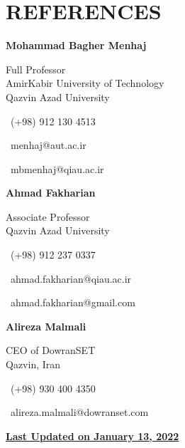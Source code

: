 \documentclass[10pt,a4paper,sans]{moderncv} %
\begin{document}
	\section{REFERENCES}
    \vspace{-1.5em}
    \begin{multicols}{3}
	        
	        \textbf{Mohammad Bagher Menhaj}
	        
	        Full Professor\\
	        AmirKabir University of Technology\\
	        Qazvin Azad University
	        
	        {\faPhone \, (+98) 912 130 4513}
	        
	        {\faAt \, menhaj@aut.ac.ir}
	        
	        {\faAt \, mbmenhaj@qiau.ac.ir}
	        
	        \columnbreak
	        
	        \textbf{Ahmad Fakharian}
	        
	        Associate Professor\\
	        Qazvin Azad University
	        
	        \faPhone \, (+98) 912 237 0337
	        
	        \faAt \, ahmad.fakharian@qiau.ac.ir
	        
	        \faAt \, ahmad.fakharian@gmail.com
            
	        
            
            
	        
	        
	        
	        \columnbreak
	        
            \textbf{Alireza Malmali}
            
            CEO of DowranSET\\
            Qazvin, Iran
            
            \faPhone \, (+98) 930 400 4350
	        
	        \faAt \, alireza.malmali@dowranset.com
 
    \end{multicols}
	
    \vspace{6em}
	\centerline{\underline{\textbf{	\faExclamationCircle \hspace{0.5 pt} Last Updated on January 13, 2022}}}
\end{document}
